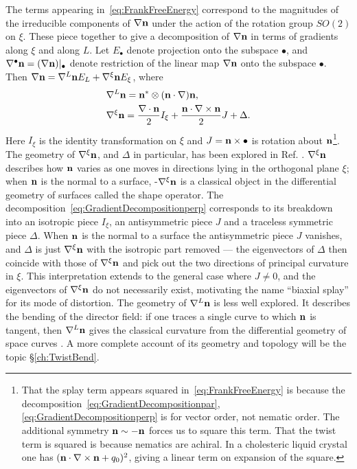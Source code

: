 The terms appearing in~\eqref{eq:FrankFreeEnergy} correspond to the magnitudes of the irreducible components of $\nabla{\bf n}$ under the action of the rotation group $SO(2)$ on $\xi$. These piece together to give a decomposition of $\nabla {\bf n}$ in terms of gradients along $\xi$ and along $L$. Let $E_\bullet$ denote projection onto the subspace $\bullet$, and $\nabla^\bullet \bf n = (\nabla \bf n)|_\bullet$ denote restriction of the linear map $\nabla \bf n$ onto the subspace $\bullet$. Then $\nabla {\bf n}=\nabla^{L}{\bf n}E_L + \nabla^\xi {\bf n}E_\xi$, where 
\begin{align}
    &\nabla^L {\bf n}=  {\bf n}^* \otimes ({\bf n} \cdot \nabla) {\bf n}\label{eq:GradientDecompositionpar}, \\
    &\nabla^\xi {\bf n}= \frac{\nabla \cdot {\bf n}}{2}I_\xi + \frac{{\bf n} \cdot \nabla \times {\bf n}}{2} J + \Delta .
    \label{eq:GradientDecompositionperp}
\end{align}
Here $I_\xi$ is the identity transformation on $\xi$ and $J= \bf n \times \bullet$ is rotation about $\bf n$\footnote{That the splay term appears squared in~\eqref{eq:FrankFreeEnergy} is because the decomposition~\eqref{eq:GradientDecompositionpar},\eqref{eq:GradientDecompositionperp} is for vector order, not nematic order. The additional symmetry $\bf n \sim -n$ forces us to square this term. That the twist term is squared is because nematics are achiral. In a cholesteric liquid crystal \citep{Bellar2014} one has $({\bf n} \cdot \nabla \times {\bf n}+q_0)^2$, giving a linear term on expansion of the square.}. The geometry of $\nabla^\xi \bf n$, and $\Delta$ in particular, has been explored in Ref. \citep{Machon2016b}. $\nabla^\xi \bf n$ describes how $\bf n$ varies as one moves in directions lying in the orthogonal plane $\xi$; when $\bf n$ is the normal to a surface, -$\nabla^\xi \bf n$ is a classical object in the differential geometry of surfaces called the shape operator. The decomposition~\eqref{eq:GradientDecompositionperp} corresponds to its breakdown into an isotropic piece $I_\xi$, an antisymmetric piece $J$ and a traceless symmetric piece $\Delta$. When $\bf n$ is the normal to a surface the antisymmetric piece $J$ vanishes, and $\Delta$ is just $\nabla^\xi \bf n$ with the isotropic part removed --- the eigenvectors of $\Delta$ then coincide with those of $\nabla^\xi \bf n$ and pick out the two directions of principal curvature in $\xi$. This interpretation extends to the general case where $J \neq 0$, and the eigenvectors of $\nabla^\xi \bf n$ do not necessarily exist, motivating the name ``biaxial splay'' for its mode of distortion. The geometry of $\nabla^L \bf n$ is less well explored. It describes the bending of the director field: if one traces a single curve to which $\bf n$ is tangent, then $\nabla^L \bf n $ gives the classical curvature from the differential geometry of space curves \citep{DoCarmoBook}. A more complete account of its geometry and topology will be the topic \S\ref{ch:TwistBend}.
 
